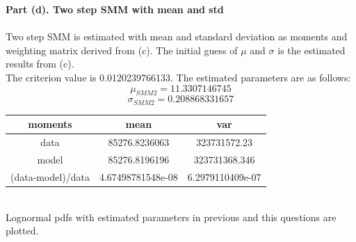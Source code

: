 \documentclass[letterpaper,12pt]{article}
\theoremstyle{definition}
\begin{document}
\clearpage

\noindent\textbf{Part (d). Two step SMM with mean and std} \\
\\
Two step SMM is estimated with mean and standard deviation as moments and weighting matrix derived from (c). The initial guess of $\mu$ and $\sigma$ is the estimated results from (c). \\
The criterion value is 0.0120239766133. The estimated parameters are as follows:
\[\mu_{SMM2}= 11.3307146745\]
\[\sigma_{SMM2}= 0.208868331657\]

\begin{center}
\begin{tabular}{ c|c|c }
 moments & mean & var \\
 \hline
 data & 85276.8236063 & 323731572.23 \\
 model & 85276.8196196 & 323731368.346 \\
 (data-model)/data & 4.67498781548e-08 & 6.2979110409e-07
\end{tabular}
\end{center}
\\

Lognormal pdfs with estimated parameters in previous and this questions are plotted. \\

\begin{figure}[htb]\centering\captionsetup{width=6.0in}
  \caption{\textbf{}}
\end{figure} \\
\end{document}
